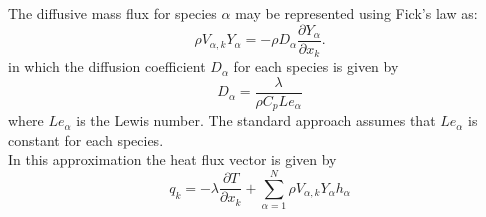 \documentclass[dvips]{article}
\begin{document}
\noindent
The diffusive mass flux for species $\alpha$ may be represented using
Fick's law as:
\begin{equation}
\rho V_{\alpha,k} Y_{\alpha} =
-\rho D_{\alpha} \frac{\partial Y_{\alpha}}{\partial x_{k}}.
\label{FICK}
\end{equation}
in which the diffusion
coefficient $D_{\alpha}$ for each species is given by
\begin{equation}
D_{\alpha} = \frac{\lambda}{\rho C_{p}{Le}_{\alpha}}
\end{equation}
where $Le_{\alpha}$ is the Lewis number.  The standard approach assumes
that $Le_{\alpha}$ is constant for each species.
\\[2mm]

\noindent
In this approximation the heat flux vector is given by
\begin{equation}
q_{k} = -\lambda\frac{\partial T}{\partial x_{k}} +
\sum_{\alpha=1}^{N}\rho V_{\alpha,k} Y_{\alpha} h_{\alpha}
\end{equation}
\end{document}
